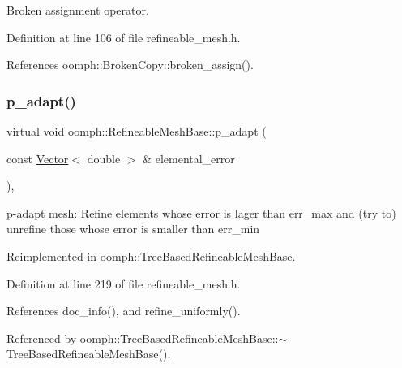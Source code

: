 Broken assignment operator. 



Definition at line 106 of file refineable\+\_\+mesh.\+h.



References oomph\+::\+Broken\+Copy\+::broken\+\_\+assign().

\mbox{\label{classoomph_1_1RefineableMeshBase_a03222065e7dfe9eac96fbd58faf0e4ab}} 
\subsubsection{\texorpdfstring{p\+\_\+adapt()}{p\_adapt()}}
{\footnotesize\ttfamily virtual void oomph\+::\+Refineable\+Mesh\+Base\+::p\+\_\+adapt (\begin{DoxyParamCaption}\item[{const \hyperlink{classoomph_1_1Vector}{Vector}$<$ double $>$ \&}]{elemental\+\_\+error }\end{DoxyParamCaption})\hspace{0.3cm}{\ttfamily [inline]}, {\ttfamily [virtual]}}



p-\/adapt mesh\+: Refine elements whose error is lager than err\+\_\+max and (try to) unrefine those whose error is smaller than err\+\_\+min 



Reimplemented in \hyperlink{classoomph_1_1TreeBasedRefineableMeshBase_acec4254dc1b7c75870cfa0bd0c4e363e}{oomph\+::\+Tree\+Based\+Refineable\+Mesh\+Base}.



Definition at line 219 of file refineable\+\_\+mesh.\+h.



References doc\+\_\+info(), and refine\+\_\+uniformly().



Referenced by oomph\+::\+Tree\+Based\+Refineable\+Mesh\+Base\+::$\sim$\+Tree\+Based\+Refineable\+Mesh\+Base().

\mbox{\label{classoomph_1_1RefineableMeshBase_a443bfce7586aecfa50b4b8a6c6078710}} 
